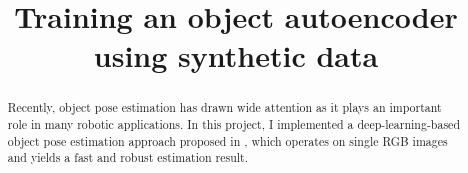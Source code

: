 \documentclass[HCR,PP,english]{hcr_thesis}
\begin{document}
\title{Training an object autoencoder using synthetic data}

\maketitle

\newpage

\phantom{u}
\begin{abstract}


Recently, object pose estimation has drawn wide attention as it plays an important role in many robotic applications. In this project, I implemented a deep-learning-based object pose estimation approach proposed in \cite{sundermeyer2018implicit}, which operates on single RGB images and yields a fast and robust estimation result. 
\end{abstract}
\newpage

\phantom{u}
\phantom{1}\vspace{6cm}
\begin{center}
\end{center}
\end{document}
